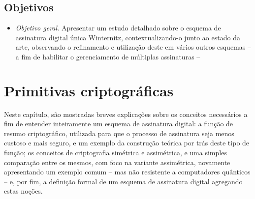 \documentclass[12pt]{report}
\begin{document}
\section{Objetivos}

\begin{itemize}



\item \emph{Objetivo geral.} Apresentar um estudo detalhado sobre o esquema de
    assinatura digital única Winternitz, contextualizando-o junto ao estado da
    arte, observando o refinamento e utilização deste em vários outros esquemas
    -- a fim de habilitar o gerenciamento de múltiplas assinaturas --

\end{itemize}

\chapter{Primitivas criptográficas}

Neste capítulo, são mostradas breves explicações sobre os conceitos
necessários a fim de entender inteiramente um esquema de assinatura digital:
a função de resumo criptográfico, utilizada para que o processo de assinatura
seja menos custoso e mais seguro, e um exemplo da construção teórica por trás
deste tipo de função; os conceitos de criptografia simétrica e assimétrica, e
uma simples comparação entre os mesmos, com foco na variante assimétrica,
novamente apresentando um exemplo comum -- mas não resistente a computadores
quânticos -- e, por fim, a definição formal de um esquema de assinatura digital
agregando estas noções.
\end{document}
